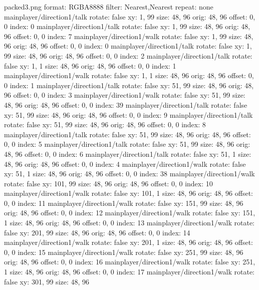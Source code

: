 packed3.png
format: RGBA8888
filter: Nearest,Nearest
repeat: none
mainplayer/direction1/talk
  rotate: false
  xy: 1, 99
  size: 48, 96
  orig: 48, 96
  offset: 0, 0
  index: 0
mainplayer/direction1/talk
  rotate: false
  xy: 1, 99
  size: 48, 96
  orig: 48, 96
  offset: 0, 0
  index: 7
mainplayer/direction1/walk
  rotate: false
  xy: 1, 99
  size: 48, 96
  orig: 48, 96
  offset: 0, 0
  index: 0
mainplayer/direction1/talk
  rotate: false
  xy: 1, 99
  size: 48, 96
  orig: 48, 96
  offset: 0, 0
  index: 2
mainplayer/direction1/talk
  rotate: false
  xy: 1, 1
  size: 48, 96
  orig: 48, 96
  offset: 0, 0
  index: 1
mainplayer/direction1/walk
  rotate: false
  xy: 1, 1
  size: 48, 96
  orig: 48, 96
  offset: 0, 0
  index: 1
mainplayer/direction1/talk
  rotate: false
  xy: 51, 99
  size: 48, 96
  orig: 48, 96
  offset: 0, 0
  index: 3
mainplayer/direction1/walk
  rotate: false
  xy: 51, 99
  size: 48, 96
  orig: 48, 96
  offset: 0, 0
  index: 39
mainplayer/direction1/talk
  rotate: false
  xy: 51, 99
  size: 48, 96
  orig: 48, 96
  offset: 0, 0
  index: 9
mainplayer/direction1/talk
  rotate: false
  xy: 51, 99
  size: 48, 96
  orig: 48, 96
  offset: 0, 0
  index: 8
mainplayer/direction1/talk
  rotate: false
  xy: 51, 99
  size: 48, 96
  orig: 48, 96
  offset: 0, 0
  index: 5
mainplayer/direction1/talk
  rotate: false
  xy: 51, 99
  size: 48, 96
  orig: 48, 96
  offset: 0, 0
  index: 6
mainplayer/direction1/talk
  rotate: false
  xy: 51, 1
  size: 48, 96
  orig: 48, 96
  offset: 0, 0
  index: 4
mainplayer/direction1/walk
  rotate: false
  xy: 51, 1
  size: 48, 96
  orig: 48, 96
  offset: 0, 0
  index: 38
mainplayer/direction1/walk
  rotate: false
  xy: 101, 99
  size: 48, 96
  orig: 48, 96
  offset: 0, 0
  index: 10
mainplayer/direction1/walk
  rotate: false
  xy: 101, 1
  size: 48, 96
  orig: 48, 96
  offset: 0, 0
  index: 11
mainplayer/direction1/walk
  rotate: false
  xy: 151, 99
  size: 48, 96
  orig: 48, 96
  offset: 0, 0
  index: 12
mainplayer/direction1/walk
  rotate: false
  xy: 151, 1
  size: 48, 96
  orig: 48, 96
  offset: 0, 0
  index: 13
mainplayer/direction1/walk
  rotate: false
  xy: 201, 99
  size: 48, 96
  orig: 48, 96
  offset: 0, 0
  index: 14
mainplayer/direction1/walk
  rotate: false
  xy: 201, 1
  size: 48, 96
  orig: 48, 96
  offset: 0, 0
  index: 15
mainplayer/direction1/walk
  rotate: false
  xy: 251, 99
  size: 48, 96
  orig: 48, 96
  offset: 0, 0
  index: 16
mainplayer/direction1/walk
  rotate: false
  xy: 251, 1
  size: 48, 96
  orig: 48, 96
  offset: 0, 0
  index: 17
mainplayer/direction1/walk
  rotate: false
  xy: 301, 99
  size: 48, 96
